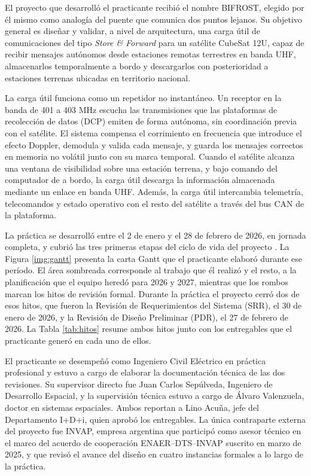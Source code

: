 El proyecto que desarrolló el practicante recibió el nombre BIFROST, elegido por él mismo como analogía del puente que comunica dos puntos lejanos. Su objetivo general es diseñar y validar, a nivel de arquitectura, una carga útil de comunicaciones del tipo \textit{Store \& Forward} para un satélite CubeSat 12U, capaz de recibir mensajes autónomos desde estaciones remotas terrestres en banda UHF, almacenarlos temporalmente a bordo y descargarlos con posterioridad a estaciones terrenas ubicadas en territorio nacional.

La carga útil funciona como un repetidor no instantáneo. Un receptor en la banda de 401 a 403 MHz escucha las transmisiones que las plataformas de recolección de datos (DCP) emiten de forma autónoma, sin coordinación previa con el satélite. El sistema compensa el corrimiento en frecuencia que introduce el efecto Doppler, demodula y valida cada mensaje, y guarda los mensajes correctos en memoria no volátil junto con su marca temporal. Cuando el satélite alcanza una ventana de visibilidad sobre una estación terrena, y bajo comando del computador de a bordo, la carga útil descarga la información almacenada mediante un enlace en banda UHF. Además, la carga útil intercambia telemetría, telecomandos y estado operativo con el resto del satélite a través del bus CAN de la plataforma.

La práctica se desarrolló entre el 2 de enero y el 28 de febrero de 2026, en jornada completa, y cubrió las tres primeras etapas del ciclo de vida del proyecto \parencite{nasaseh}. La Figura \ref{img:gantt} presenta la carta Gantt que el practicante elaboró durante ese período. El área sombreada corresponde al trabajo que él realizó y el resto, a la planificación que el equipo heredó para 2026 y 2027, mientras que los rombos marcan los hitos de revisión formal. Durante la práctica el proyecto cerró dos de esos hitos, que fueron la Revisión de Requerimientos del Sistema (SRR), el 30 de enero de 2026, y la Revisión de Diseño Preliminar (PDR), el 27 de febrero de 2026. La Tabla \ref{tab:hitos} resume ambos hitos junto con los entregables que el practicante generó en cada uno de ellos.

El practicante se desempeñó como Ingeniero Civil Eléctrico en práctica profesional y estuvo a cargo de elaborar la documentación técnica de las dos revisiones. Su supervisor directo fue Juan Carlos Sepúlveda, Ingeniero de Desarrollo Espacial, y la supervisión técnica estuvo a cargo de Álvaro Valenzuela, doctor en sistemas espaciales. Ambos reportan a Lino Acuña, jefe del Departamento I+D+i, quien aprobó los entregables. La única contraparte externa del proyecto fue INVAP, empresa argentina que participó como asesor técnico en el marco del acuerdo de cooperación ENAER--DTS--INVAP suscrito en marzo de 2025, y que revisó el avance del diseño en cuatro instancias formales a lo largo de la práctica.

